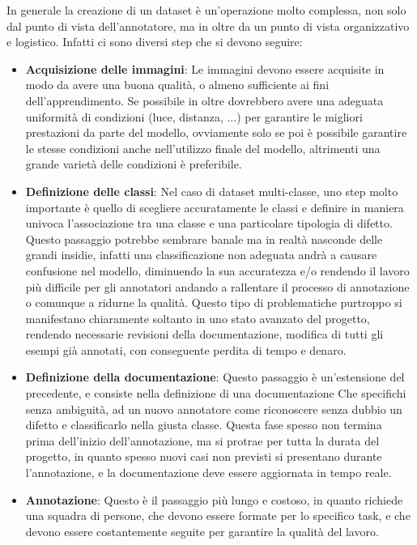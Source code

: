 In generale la creazione di un dataset è un'operazione molto complessa, non solo dal punto di vista dell'annotatore, ma in oltre da un punto di vista
organizzativo e logistico. Infatti ci sono diversi step che si devono seguire:
\begin{itemize}
    \item \textbf{Acquisizione delle immagini}: Le immagini devono essere acquisite in modo da avere una buona qualità, o almeno sufficiente ai fini dell'apprendimento.
        Se possibile in oltre dovrebbero avere una adeguata uniformità di condizioni (luce, distanza, ...) per garantire le migliori prestazioni da parte del modello,
        ovviamente solo se poi è possibile garantire le stesse condizioni anche nell'utilizzo finale del modello, altrimenti una grande varietà delle condizioni
        è preferibile.
    \item \textbf{Definizione delle classi}: Nel caso di dataset multi-classe, uno step molto importante è quello di scegliere accuratamente le classi
        e definire in maniera univoca l'associazione tra una classe e una particolare tipologia di difetto. Questo passaggio potrebbe sembrare banale ma in realtà
        nasconde delle grandi insidie, infatti una classificazione non adeguata andrà a causare confusione nel modello, diminuendo la sua accuratezza e/o 
        rendendo il lavoro più difficile per gli annotatori andando a rallentare il processo di annotazione o comunque a ridurne la qualità.
        Questo tipo di problematiche purtroppo si manifestano chiaramente soltanto in uno stato avanzato del progetto,
        rendendo necessarie revisioni della documentazione, modifica di tutti gli esempi già annotati, con conseguente perdita di tempo e denaro.
    \item \textbf{Definizione della documentazione}: Questo passaggio è un'estensione del precedente, e consiste nella definizione di una documentazione
        Che specifichi senza ambiguità, ad un nuovo annotatore come riconoscere senza dubbio un difetto e classificarlo nella giusta classe.
        Questa fase spesso non termina prima dell'inizio dell'annotazione, ma si protrae per tutta la durata del progetto, in quanto
        spesso nuovi casi non previsti si presentano durante l'annotazione, e la documentazione deve essere aggiornata in tempo reale.
    \item \textbf{Annotazione}: Questo è il passaggio più lungo e costoso, in quanto richiede una squadra di persone,
        che devono essere formate per lo specifico task, e che devono essere costantemente seguite per garantire la qualità del lavoro.

\end{itemize}
